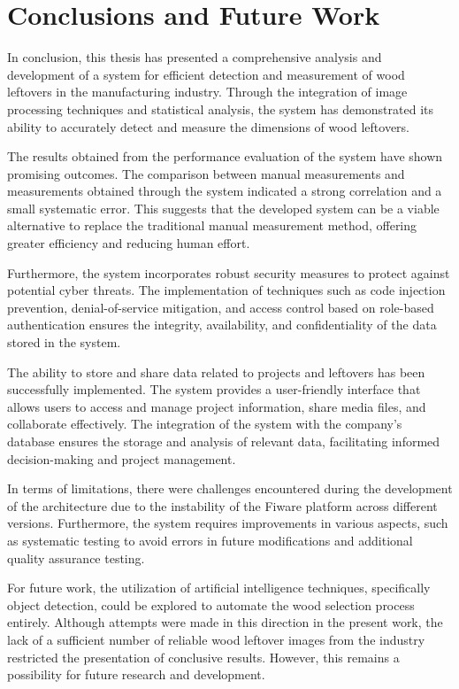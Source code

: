 \chapter{Conclusions and Future Work}\label{cap:conclusions}

In conclusion, this thesis has presented a comprehensive analysis and development of a system for efficient detection and measurement of wood leftovers in the manufacturing industry. Through the integration of image processing techniques and statistical analysis, the system has demonstrated its ability to accurately detect and measure the dimensions of wood leftovers.

The results obtained from the performance evaluation of the system have shown promising outcomes. The comparison between manual measurements and measurements obtained through the system indicated a strong correlation and a small systematic error. This suggests that the developed system can be a viable alternative to replace the traditional manual measurement method, offering greater efficiency and reducing human effort.

Furthermore, the system incorporates robust security measures to protect against potential cyber threats. The implementation of techniques such as code injection prevention, denial-of-service mitigation, and access control based on role-based authentication ensures the integrity, availability, and confidentiality of the data stored in the system.

The ability to store and share data related to projects and leftovers has been successfully implemented. The system provides a user-friendly interface that allows users to access and manage project information, share media files, and collaborate effectively. The integration of the system with the company's database ensures the storage and analysis of relevant data, facilitating informed decision-making and project management.

In terms of limitations, there were challenges encountered during the development of the architecture due to the instability of the Fiware platform across different versions. Furthermore, the system requires improvements in various aspects, such as systematic testing to avoid errors in future modifications and additional quality assurance testing.

For future work, the utilization of artificial intelligence techniques, specifically object detection, could be explored to automate the wood selection process entirely. Although attempts were made in this direction in the present work, the lack of a sufficient number of reliable wood leftover images from the industry restricted the presentation of conclusive results. However, this remains a possibility for future research and development.